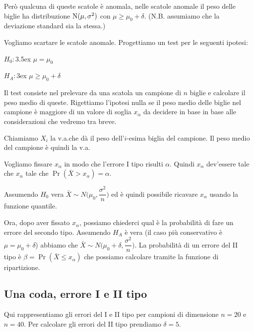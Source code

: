 \documentclass[11pt,openany]{book}
\begin{document}
Però qualcuna di queste scatole è anomala, nelle scatole anomale il peso delle biglie ha distribuzione ${\rm N}(\mu,\sigma^2)$ con $\mu\ge\mu_0+\delta$. (N.B. assumiamo che la deviazione standard sia la stessa.)

Vogliamo scartare le scatole anomale. 
Progettiamo un test per le seguenti ipotesi:

$H_0:$\kern3.5ex $\mu=\mu_0$

$H_A:$\kern3ex $\mu\ge\mu_0+\delta$

Il test consiste nel prelevare da una scatola un campione di $n$ biglie e calcolare il peso medio di queste. 
Rigettiamo l'ipotesi nulla se il peso medio delle biglie nel campione è maggiore di un valore di soglia $x_\alpha$ da decidere in base in base alle considerazioni che vedremo tra breve.

Chiamiamo $X_i$ la v.a.\@ che dà il peso dell'$i$-esima biglia del campione.
Il peso medio del campione è quindi la v.a.\@



Vogliamo fissare $x_\alpha$ in modo che l'errore I tipo risulti $\alpha$. 
Quindi $x_\alpha$ dev'essere tale che $x_\alpha$ tale che $\Pr(\bar X>x_\alpha)=\alpha$.

Assumendo $H_0$ vera $\bar X\sim N\bigg(\mu_0,\dfrac{\sigma^2}{n}\bigg)$ ed è quindi possibile ricavare $x_\alpha$ usando la funzione quantile.


Ora, dopo aver fissato $x_\alpha$, possiamo chiederci qual è la probabilità di fare un errore del secondo tipo.
Assumendo $H_A$ è vera (il caso più conservativo è $\mu=\mu_0+\delta$) abbiamo che $\bar X\sim N\bigg(\mu_0+\delta,\dfrac{\sigma^2}{n}\bigg)$. 
La probabilità di un errore del II tipo è $\beta=\Pr(\bar X\le x_\alpha)$ che possiamo calcolare tramite la funzione di ripartizione.

% 



\clearpage\subsection{Una coda, errore I e II tipo}

Qui rappresentiamo gli errori del I e II tipo per campioni di dimensione $n=20$ e $n= 40$. Per calcolare gli errori del II tipo prendiamo $\delta=5$.
\end{document}
